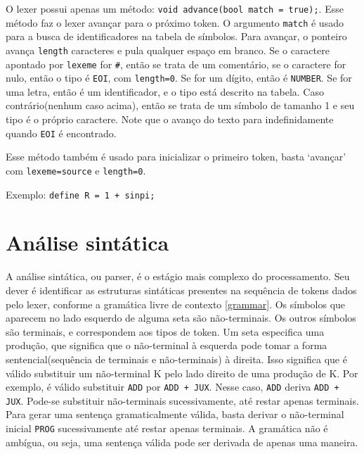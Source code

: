 \documentclass[10pt,a4paper]{article}
\begin{document}
O lexer possui apenas um método: \texttt{void advance(bool match = true);}.
Esse método faz o lexer avançar para o próximo token.
O argumento \texttt{match} é usado para a busca de identificadores na tabela de símbolos.
Para avançar, o ponteiro avança \texttt{length} caracteres e pula qualquer espaço em branco.
Se o caractere apontado por \texttt{lexeme} for \texttt{\#}, então se trata de um comentário,
 se o caractere for nulo, então o tipo é \texttt{EOI}, com \texttt{length=0}.
 Se for um dígito, então é \texttt{NUMBER}. Se for uma letra, então é um identificador,
 e o tipo está descrito na tabela. Caso contrário(nenhum caso acima),
 então se trata de um símbolo de tamanho 1 e seu tipo é o próprio caractere.
 Note que o avanço do texto para indefinidamente quando \texttt{EOI} é encontrado.

Esse método também é usado para inicializar o primeiro token, basta `avançar' com \texttt{lexeme=source} e
\texttt{length=0}.

Exemplo: \texttt{define R = 1 + sinpi;}


\section{Análise sintática}
A análise sintática, ou parser, é o estágio mais complexo do processamento.
Seu dever é identificar as estruturas sintáticas presentes na sequência de tokens dados pelo lexer,
conforme a gramática livre de contexto \ref{grammar}.
Os símbolos que aparecem no lado esquerdo de alguma seta são não-terminais.
Os outros símbolos são terminais, e correspondem aos tipos de token.
Um seta especifica uma produção, que significa que
o não-terminal à esquerda pode tomar a forma sentencial(sequência de terminais e não-terminais) à direita. 
Isso significa que é válido substituir um não-terminal K pelo lado direito de uma produção de K.
Por exemplo, é válido substituir \texttt{ADD} por \texttt{ADD + JUX}.
Nesse caso, \texttt{ADD} deriva \texttt{ADD + JUX}.
Pode-se substituir não-terminais sucessivamente, até restar apenas terminais.
Para gerar uma sentença gramaticalmente válida,
basta derivar o não-terminal inicial \texttt{PROG} sucessivamente até restar apenas terminais.
A gramática não é ambígua, ou seja, uma sentença válida pode ser derivada de apenas uma maneira.
\end{document}
